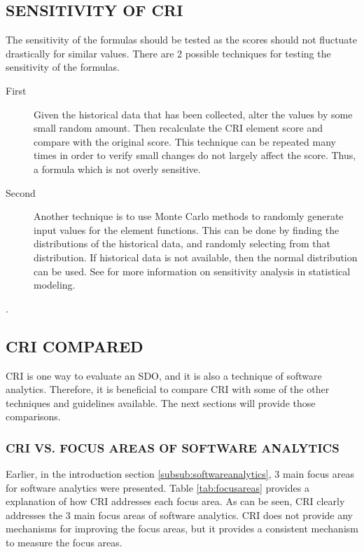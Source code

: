 \documentclass[SDSUThesis.tex]{subfiles}
\begin{document}
    \subsection{SENSITIVITY OF CRI}
    \label{sec:sensitivity}
        The sensitivity of the formulas should be tested as the scores should not
        fluctuate drastically for similar values.  There are 2 possible techniques
        for testing the sensitivity of the formulas. 
        \begin{description}
            \item[First] Given the historical data that has been collected,
                alter the values by some small random amount.  Then recalculate
                the CRI element score and compare with the original score.  This
                technique can be repeated many times in order to verify
                small changes do not largely affect the score.  Thus, a 
                formula which is not overly sensitive. 
            \item[Second] Another technique is to use Monte Carlo methods to 
                randomly generate input values for the element functions.  
                This can be done by finding the distributions of the historical
                data, and randomly selecting from that distribution.  If historical
                data is not available, then the normal distribution can be used.
                See \cite{Saltelli2000} for more information on sensitivity analysis 
                in statistical modeling.
        \end{description}
        
        .

    \subsection{CRI COMPARED}
        CRI is one way to evaluate an SDO, and it is also a technique of
        software analytics.  Therefore, it is beneficial to compare CRI
        with some of the other techniques and guidelines available. The
        next sections will provide those comparisons.
    
        \subsubsection{CRI VS. FOCUS AREAS OF SOFTWARE ANALYTICS}
    
            Earlier, in the introduction section \ref{subsub:softwareanalytics}, 3 main focus 
            areas  for software
            analytics were presented.  Table \ref{tab:focusareas} provides a explanation of how CRI addresses
            each focus area.  
            As can be seen, CRI clearly addresses the 3 main focus areas of software analytics.  CRI does not provide
            any mechanisms for improving the focus areas, but it provides a consistent mechanism to measure
            the focus areas. 
            
\end{document}
